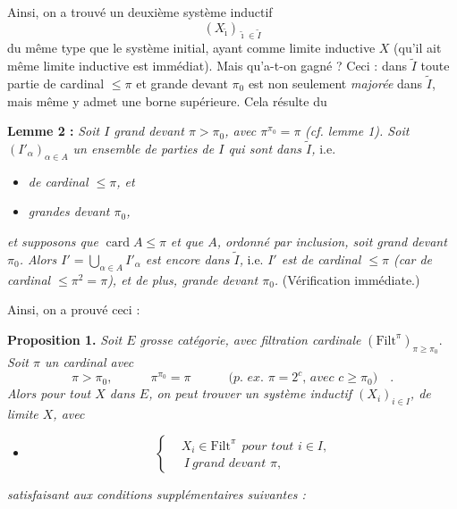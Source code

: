 \documentclass[11pt]{article}
\newcommand{\msp}[1]{\marginpar{\footnotesize [#1]}}
\newcommand{\card}{\operatorname{card}}
\newcommand{\Filt}{\mathrm{Filt}}
\begin{document}
Ainsi, on a trouvé un deuxième système inductif
\[
(X_{\tilde\imath})_{\tilde\imath\in\tilde I}
\]
du même type que le système initial, ayant comme limite inductive $X$ (qu'il ait même limite inductive est immédiat). Mais qu'a-t-on gagné ? Ceci : dans $\tilde I$ toute partie de cardinal $\le\pi$ et grande devant $\pi_0$ est non seulement \textit{majorée} dans $\tilde I$, mais même y admet une borne supérieure. Cela résulte du %

\msp{page 83}
\textbf{Lemme 2 :} \textit{Soit $I$ grand devant $\pi>\pi_0$, avec $\pi^{\pi_0}=\pi$} \textit{(cf. lemme 1). Soit $(I'_\alpha)_{\alpha\in A}$ un ensemble de parties de $I$ qui sont dans $\tilde I$,} i.e.

\begin{itemize}
\item[a)] \textit{de cardinal $\le\pi$, et}
\item[b)] \textit{grandes devant $\pi_0$,}
\end{itemize}

\textit{et supposons que} $\card A\le\pi$ \textit{et que $A$, ordonné par inclusion, soit grand devant $\pi_0$. Alors $I'=\bigcup_{\alpha\in A} I'_\alpha$ est encore dans $\tilde I$,} i.e. \textit{$I'$ est de cardinal $\le\pi$ (car de cardinal $\le\pi^2=\pi$), et de plus, grande devant $\pi_0$.} (Vérification immédiate.)

Ainsi, on a prouvé ceci :

\textbf{Proposition 1.} \textit{Soit $E$} \textit{grosse catégorie, avec filtration cardinale} $(\Filt^\pi)_{\pi\ge\pi_0}$. \textit{Soit $\pi$ un cardinal avec}
\[
\pi>\pi_0, \qquad\quad \pi^{\pi_0}=\pi \qquad\quad \textit{(p. ex. $\pi=2^c$, avec $c\ge\pi_0$)} \quad .
\]
\textit{Alors pour tout $X$ dans $E$, on peut trouver un système inductif $(X_i)_{i\in I}$, de limite $X$, avec}

\begin{itemize}
\item[a)] \[ \left\{ \begin{aligned} & X_i\in\Filt^\pi \ \ \textit{pour tout $i\in I$,} \\ & \ I \ \textit{grand devant $\pi$,} \end{aligned} \right. \]
\end{itemize}

\textit{satisfaisant aux conditions supplémentaires suivantes :}
\end{document}
